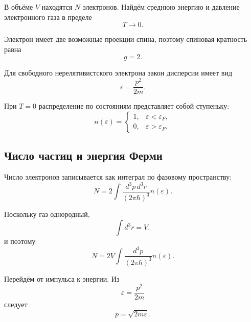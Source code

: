 \documentclass[../final.tex]{subfiles}
\begin{document}
В объёме $V$ находятся $N$ электронов.
Найдём среднюю энергию и давление электронного газа в пределе
%
\begin{equation*}
    T\to0.
\end{equation*}

Электрон имеет две возможные проекции спина, поэтому
спиновая кратность равна
%
\begin{equation*}
    g=2.
\end{equation*}

Для свободного нерелятивистского электрона закон дисперсии имеет вид
%
\begin{equation*}
    \varepsilon
    =
    \frac{p^2}{2m}.
\end{equation*}

При $T=0$ распределение по состояниям представляет собой ступеньку:
%
\begin{equation*}
    n(\varepsilon)
    =
    \begin{cases}
        1,
        &
        \varepsilon<\varepsilon_F,
        \\[4pt]
        0,
        &
        \varepsilon>\varepsilon_F.
    \end{cases}
\end{equation*}



\subsection*{Число частиц и энергия Ферми}

Число электронов записывается как интеграл по фазовому пространству:
%
\begin{equation*}
    N
    =
    2
    \int
    \frac{
        d^3p\,d^3r
    }{
        (2\pi\hbar)^3
    }
    n(\varepsilon).
\end{equation*}

Поскольку газ однородный,
%
\begin{equation*}
    \int d^3r
    =
    V,
\end{equation*}
%
и поэтому
%
\begin{equation*}
    N
    =
    2V
    \int
    \frac{
        d^3p
    }{
        (2\pi\hbar)^3
    }
    n(\varepsilon).
\end{equation*}

Перейдём от импульса к энергии.
Из
%
\begin{equation*}
    \varepsilon
    =
    \frac{p^2}{2m}
\end{equation*}
%
следует
%
\begin{equation*}
    p
    =
    \sqrt{2m\varepsilon}.
\end{equation*}
\end{document}
